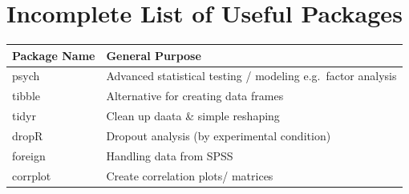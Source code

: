 \documentclass[
]{book}
\begin{document}
\section*{Incomplete List of Useful Packages}\label{lop}

\begin{longtable}[]{@{}ll@{}}
\toprule\noalign{}
Package Name & General Purpose \\
\midrule\noalign{}
\endhead
\bottomrule\noalign{}
\endlastfoot
psych & Advanced statistical testing / modeling e.g.~factor analysis \\
tibble & Alternative for creating data frames \\
tidyr & Clean up daata \& simple reshaping \\
dropR & Dropout analysis (by experimental condition) \\
foreign & Handling data from SPSS \\
corrplot & Create correlation plots/ matrices \\
\end{longtable}

  
\end{document}
